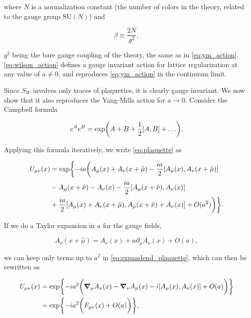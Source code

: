 \documentclass[reqno,12pt]{article}
\numberwithin{equation}{section}
\newcommand{\SU}{\mathrm{SU}}
\begin{document}
where $N$ is a normalization constant (the number of colors in the theory, related to the gauge group $\SU(N)$) and

\begin{equation} \label{eq:beta}
	\beta \equiv \frac{2N}{g^2},
\end{equation}

$g^2$ being the bare gauge coupling of the theory, the same as in \eqref{eq:ym_action}. \eqref{eq:wilson_action} defines
a gauge invariant action for lattice regularization at any value of $a \ne 0$, and reproduces \eqref{eq:ym_action} in the 
continuum limit.

Since $S_W$ involves only traces of plaquettes, it is clearly gauge invariant. We now show that it also reproduces the
Yang-Mills action for $a \rightarrow 0$. Consider the Campbell formula

\begin{equation}
	e^A e^B = \exp(A + B + \frac{1}{2}\qty[A, B] + \dots).
\end{equation}

Applying this formula iteratively, we write \eqref{eq:plaquette} as 

\begin{equation} \label{eq:expandend_plaquette}
	\begin{aligned}
		U_{\mu\nu}(x) &= \exp \biggl\{ -ia\biggl( A_\mu(x) + A_\nu(x + \hat{\mu}) - \frac{ia}{2}\qty[A_\mu(x), A_\nu(x+\hat\mu)] \\
		&- A_\mu(x + \hat\nu) - A_\nu(x) - \frac{ia}{2}\qty[A_\mu(x + \hat\nu), A_\nu(x)] \\
		&+ \frac{ia}{2}\qty[A_\mu(x) + A_\nu(x+\hat\mu), A_\mu(x + \hat\nu) + A_\nu(x)] + O(a^2) \biggr) \biggr\}.
	\end{aligned}
\end{equation}

If we do a Taylor expansion in $a$ for the gauge fields,

\begin{equation}
	A_\nu(x + \hat\mu) = A_\nu(x) + a \partial_\mu A_\nu(x) + O(a),
\end{equation}

we can keep only terms up to $a^2$ in \eqref{eq:expandend_plaquette}, which can then be rewritten as

\begin{equation} \label{eq:plaquette_in_Fmunu}
	\begin{aligned}
		U_{\mu\nu}(x) &= \exp{-ia^2\biggl( \grad_\mu A_\nu(x) - \grad_\nu A_\mu(x) - i\qty[A_\mu(x), A_\nu(x)] + O(a) \biggr)} \\
		&= \exp{-ia^2 \biggl(F_{\mu\nu}(x) + O(a)\biggr)},
	\end{aligned}
\end{equation}
\end{document}
